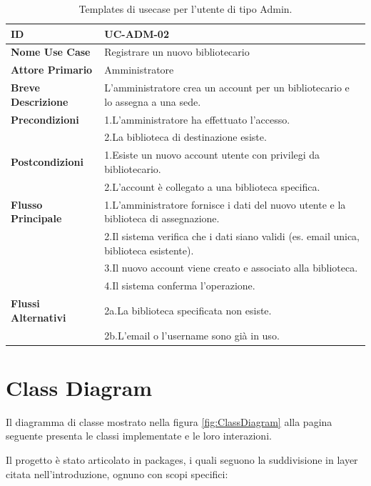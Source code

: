 \documentclass[
  italian,
  paper=a4,
  ,captions=tableheading
]{scrbook}
\begin{document}
\begin{table}[h!]
\begin{minipage}{0.45\textwidth}
{\begin{tabular}{|p{4.5cm}|p{10cm}|}
\textbf{ID} & UC-ADM-02 \\ \hline
\textbf{Nome Use Case} & Registrare un nuovo bibliotecario \\ \hline
\textbf{Attore Primario} & Amministratore \\ \hline
\textbf{Breve Descrizione} & L'amministratore crea un account per un bibliotecario e lo assegna a una sede. \\ \hline
\textbf{Precondizioni} & 1.\;L'amministratore ha effettuato l'accesso.\\
 & 2.\;La biblioteca di destinazione esiste. \\ \hline
\textbf{Postcondizioni} & 1.\;Esiste un nuovo account utente con privilegi da bibliotecario.\\
 & 2.\;L'account è collegato a una biblioteca specifica. \\ \hline
\textbf{Flusso Principale} & 1.\;L'amministratore fornisce i dati del nuovo utente e la biblioteca di assegnazione.\\
 & 2.\;Il sistema verifica che i dati siano validi (es. email unica, biblioteca esistente).\\
 & 3.\;Il nuovo account viene creato e associato alla biblioteca.\\
 & 4.\;Il sistema conferma l'operazione. \\ \hline
\textbf{Flussi Alternativi} & 2a.\;La biblioteca specificata non esiste.\\
 & 2b.\;L'email o l'username sono già in uso. \\ \hline

    \hline
  \end{tabular}
}
\end{minipage}
\caption{Templates di usecase per l'utente di tipo Admin.}
\end{table}

\section{Class Diagram}\label{class-diagram}

Il diagramma di classe mostrato nella figura \ref{fig:ClassDiagram} alla
pagina seguente presenta le classi implementate e le loro interazioni.

Il progetto è stato articolato in packages, i quali seguono la
suddivisione in layer citata nell'introduzione, ognuno con scopi
specifici:
\end{document}
